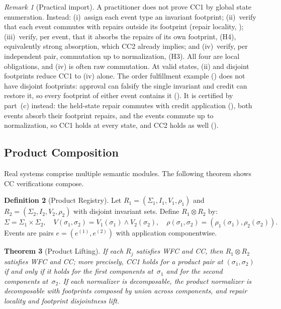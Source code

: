 \documentclass[11pt,a4paper]{article}
\theoremstyle{plain}
\newtheorem{theorem}{Theorem}[section]
\theoremstyle{definition}
\newtheorem{definition}[theorem]{Definition}
\theoremstyle{remark}
\newtheorem{remark}[theorem]{Remark}
\begin{document}
\begin{remark}[Practical import]
\label{rem:practical-import}
A practitioner does not prove CC1 by global state enumeration.  Instead:
(i)~assign each event type an invariant footprint; (ii)~verify that each
event commutes with repairs outside its footprint (repair locality,
); (iii)~verify, per event, that it absorbs the
repairs of its own footprint, (H4), equivalently strong absorption, which CC2
already implies; and (iv)~verify, per independent pair, commutation up to
normalization, (H3).  All four are local obligations, and (iv) is often raw
commutation.  At valid states, (ii) and disjoint footprints reduce CC1 to
(iv) alone.  The order fulfillment example () does not have
disjoint footprints: approval can falsify the single invariant and credit can
restore it, so every footprint of either event contains it
().  It is certified by part~(c)
instead: the held-state repair commutes with credit application
(), both events absorb their footprint
repairs, and the events commute up to normalization, so CC1 holds at every
state, and CC2 holds as well ().
\end{remark}

\subsection{Product Composition}

Real systems comprise multiple semantic modules.  The following theorem shows
CC verifications compose.

\begin{definition}[Product Registry]
\label{def:product}
Let $R_1 = (\Sigma_1, I_1, V_1, \rho_1)$ and $R_2 = (\Sigma_2, I_2, V_2,
\rho_2)$ with disjoint invariant sets.  Define $R_1 \otimes R_2$ by:
\[
\Sigma = \Sigma_1 \times \Sigma_2, \quad
V(\sigma_1, \sigma_2) = V_1(\sigma_1) \wedge V_2(\sigma_2), \quad
\rho(\sigma_1, \sigma_2) = (\rho_1(\sigma_1), \rho_2(\sigma_2)).
\]
Events are pairs $e = (e^{(1)}, e^{(2)})$ with application componentwise.
\end{definition}

\begin{theorem}[Product Lifting]
\label{thm:product}
If each $R_j$ satisfies WFC and CC, then $R_1 \otimes R_2$ satisfies WFC and
CC; more precisely, CC1 holds for a product pair at $(\sigma_1, \sigma_2)$ if
and only if it holds for the first components at~$\sigma_1$ and for the
second components at~$\sigma_2$.  If each normalizer is decomposable, the
product normalizer is decomposable with footprints composed by union across
components, and repair locality and footprint disjointness lift.
\end{theorem}
\end{document}
